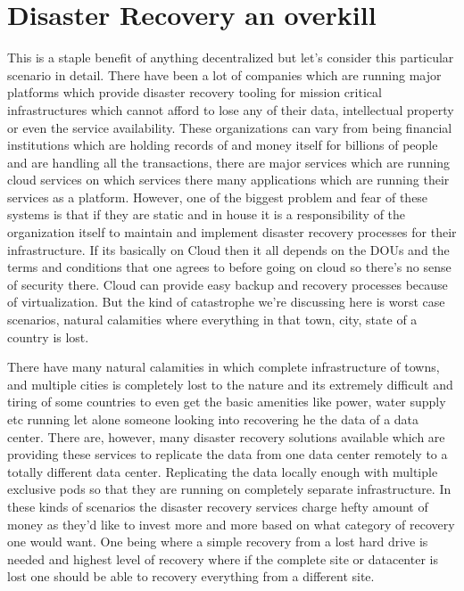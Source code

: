 \section{Disaster Recovery an overkill}
This is a staple benefit of anything decentralized but let's consider this particular scenario in detail. There have been a lot of companies which are running major platforms which provide disaster recovery tooling for mission critical infrastructures which cannot afford to lose any of their data, intellectual property or even the service availability. These organizations can vary from being financial institutions which are holding records of and money itself for billions of people and are handling all the transactions, there are major services which are running cloud services on which services there many applications which are running their services as a platform. However, one of the biggest problem and fear of these systems is that if they are static and in house it is a responsibility of the organization itself to maintain and implement disaster recovery processes for their infrastructure. If its basically on Cloud then it all depends on the DOUs and the terms and conditions that one agrees to before going on cloud so there's no sense of security there. Cloud can provide easy backup and recovery processes because of virtualization. But the kind of catastrophe we're discussing here is worst case scenarios, natural calamities where everything in that town, city, state of a country is lost.

There have many natural calamities in which complete infrastructure of towns, and multiple cities is completely lost to the nature and its extremely difficult and tiring of some countries to even get the basic amenities like power, water supply etc running let alone someone looking into recovering he the data of a data center. There are, however, many disaster recovery solutions available which are providing these services to replicate the data from one data center remotely to a totally different data center. Replicating the data locally enough with multiple exclusive pods so that they are running on completely separate infrastructure. In these kinds of scenarios the disaster recovery services charge hefty amount of money as they'd like to invest more and more based on what category of recovery one would want. One being where a simple recovery from a lost hard drive is needed and highest level of recovery where if the complete site or datacenter is lost one should be able to recovery everything from a different site.

